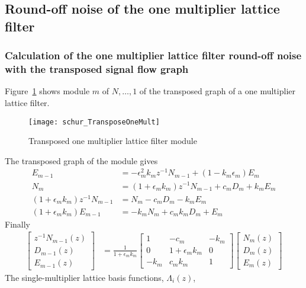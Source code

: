 \documentclass[a4paper,twoside,10pt,english]{report}
\begin{document}
\subsection{Round-off noise of the one multiplier lattice filter}
\subsubsection{Calculation of the one multiplier lattice filter round-off noise with the transposed signal flow graph}
Figure~\ref{fig:Transposed-One-Multiplier} shows module $m$ of $N,\ldots,1$
of the transposed graph of a one multiplier lattice filter.
\begin{figure}[!htbp]
\begin{center}
\texttt{[image: schur\_TransposeOneMult]}
\caption{Transposed one multiplier lattice filter module}
\label{fig:Transposed-One-Multiplier}
\end{center}
\end{figure}
The transposed graph of the module gives
\begin{align*}
E_{m-1} & = -\epsilon_{m}^{2}k_{m}z^{-1}N_{m-1}+\left(1-k_{m}\epsilon_{m}\right)E_{m}\\
N_{m} & = \left(1+\epsilon_{m}k_{m}\right)z^{-1}N_{m-1}+c_{m}D_{m}+k_{m}E_{m}\\
\left(1+\epsilon_{m}k_{m}\right)z^{-1}N_{m-1} & = N_{m}-c_{m}D_{m}-k_{m}E_{m}\\
\left(1+\epsilon_{m}k_{m}\right)E_{m-1} & = -k_{m}N_{m}+c_{m}k_{m}D_{m}+E_{m}
\end{align*}
Finally
\begin{align*}
\left[\begin{array}{c}
z^{-1}N_{m-1}\left(z\right)\\
D_{m-1}\left(z\right)\\
E_{m-1}\left(z\right)
\end{array}\right] & = \frac{1}{1+\epsilon_{m}k_{m}}\left[\begin{array}{ccc}
1 & -c_{m} & -k_{m}\\
0 & 1+\epsilon_{m}k_{m} & 0\\
-k_{m} & c_{m}k_{m} & 1
\end{array}\right]\left[\begin{array}{c}
N_{m}\left(z\right)\\
D_{m}\left(z\right)\\
E_{m}\left(z\right)
\end{array}\right]
\end{align*}
The single-multiplier lattice basis functions, $\Lambda_{i}\left(z\right)$,
\end{document}
